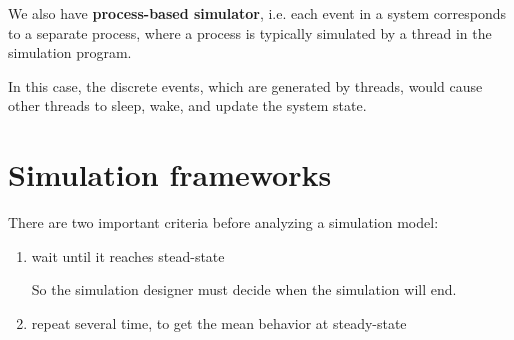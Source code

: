 We also have {\bf process-based simulator}, i.e.
each event in a system corresponds to a separate process, where a process is
typically simulated by a thread in the simulation program.

In this case, the discrete events, which are generated by threads, would cause
other threads to sleep, wake, and update the system state.

\subsection{}

\section{Simulation frameworks}


There are two important criteria before analyzing a simulation model:
\begin{enumerate}
  \item wait until it reaches stead-state
  
  So the simulation designer must decide when the simulation will end. 
  
  
  \item repeat several time, to get the mean behavior at steady-state 
\end{enumerate}

